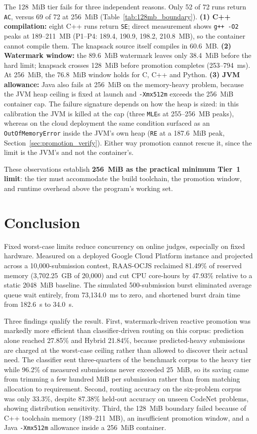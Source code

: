 \documentclass[conference]{IEEEtran}
\begin{document}
The 128~MiB tier fails for three independent reasons. Only 52 of 72 runs return \texttt{AC}, versus 69 of 72 at 256~MiB (Table~\ref{tab:128mb_boundary}). \textbf{(1) C++ compilation:} eight C++ runs return \texttt{SE}; direct measurement shows \texttt{g++ -O2} peaks at 189--211~MB (P1--P4: 189.4, 190.9, 198.2, 210.8~MB), so the container cannot compile them. The knapsack source itself compiles in 60.6~MB. \textbf{(2) Watermark window:} the 89.6~MiB watermark leaves only 38.4~MiB before the hard limit; knapsack crosses 128~MiB before promotion completes (253--794~ms). At 256~MiB, the 76.8~MiB window holds for C, C++ and Python. \textbf{(3) JVM allowance:} Java also fails at 256~MiB on the memory-heavy problem, because the JVM heap ceiling is fixed at launch and \texttt{-Xmx512m} exceeds the 256~MiB container cap. The failure signature depends on how the heap is sized: in this calibration the JVM is killed at the cap (three \texttt{MLE}s at 255--256~MB peaks), whereas on the cloud deployment the same condition surfaced as an \texttt{OutOfMemoryError} inside the JVM's own heap (\texttt{RE} at a 187.6~MiB peak, Section~\ref{sec:promotion_verify}). Either way promotion cannot rescue it, since the limit is the JVM's and not the container's.

These observations establish \textbf{256~MiB as the practical minimum Tier~1 limit}: the tier must accommodate the build toolchain, the promotion window, and runtime overhead above the program's working set.

\section{Conclusion}
Fixed worst-case limits reduce concurrency on online judges, especially on fixed hardware. Measured on a deployed Google Cloud Platform instance and projected across a 10,000-submission contest, RAAS-OCJS reclaimed 81.49\% of reserved memory (3,702.25~GB of 20,000) and cut CPU core-hours by 47.93\% relative to a static 2048~MiB baseline. The simulated 500-submission burst eliminated average queue wait entirely, from 73,134.0~ms to zero, and shortened burst drain time from 182.6~s to 34.0~s.

Three findings qualify the result. First, watermark-driven reactive promotion was markedly more efficient than classifier-driven routing on this corpus: prediction alone reached 27.85\% and Hybrid 21.84\%, because predicted-heavy submissions are charged at the worst-case ceiling rather than allowed to discover their actual need. The classifier sent three-quarters of the benchmark corpus to the heavy tier while 96.2\% of measured submissions never exceeded 25~MiB, so its saving came from trimming a few hundred MiB per submission rather than from matching allocation to requirement. Second, routing accuracy on the six-problem corpus was only 33.3\%, despite 87.38\% held-out accuracy on unseen CodeNet problems, showing distribution sensitivity. Third, the 128~MiB boundary failed because of C++ toolchain memory (189--211~MB), an insufficient promotion window, and a Java \texttt{-Xmx512m} allowance inside a 256~MiB container.
\end{document}
